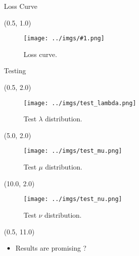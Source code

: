 \documentclass[10pt, xcolor={dvipsnames}, aspectratio = 169, sans,mathserif]{beamer}
\newcommand{\leftpic}[2]
{
\begin{textblock}{7.0}(0.5, 1.0)
\begin{figure}
    \centering
    \texttt{[image: ../imgs/\#1.png]}
    \caption{#2}
\end{figure}
\end{textblock}
}
\begin{document}
\begin{frame}{Loss Curve}

\leftpic{loss_curve}{Loss curve.}

\end{frame}

\begin{frame}{Testing}

\begin{textblock}{5.0}(0.5, 2.0)
\begin{figure}
    \centering
    \texttt{[image: ../imgs/test\_lambda.png]}
    \caption{Test $\lambda$ distribution.}
\end{figure}
\end{textblock}

\begin{textblock}{5.0}(5.0, 2.0)
\begin{figure}
    \centering
    \texttt{[image: ../imgs/test\_mu.png]}
    \caption{Test $\mu$ distribution.}
\end{figure}
\end{textblock}

\begin{textblock}{5.0}(10.0, 2.0)
\begin{figure}
    \centering
    \texttt{[image: ../imgs/test\_nu.png]}
    \caption{Test $\nu$ distribution.}
\end{figure}
\end{textblock}

\begin{textblock}{15.0}(0.5, 11.0)

\begin{itemize}
    \item Results are promising ?
\end{itemize}

\end{textblock}

\end{frame}
\end{document}
